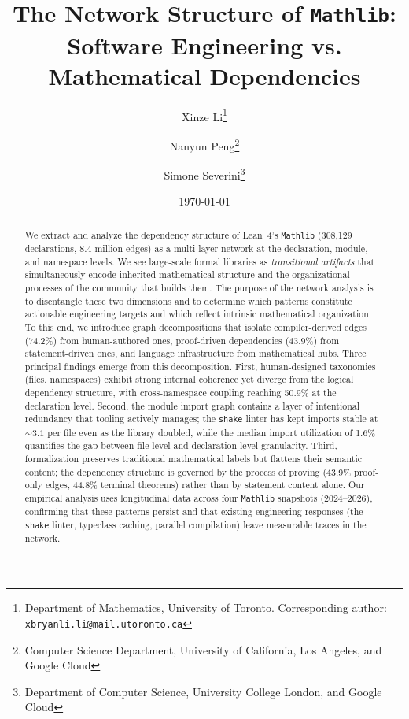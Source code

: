 \documentclass[10pt]{article}
\title{The Network Structure of \texttt{Mathlib}:\\ Software Engineering vs. Mathematical Dependencies}
\author{
  Xinze Li\thanks{Department of Mathematics, University of Toronto. Corresponding author: \texttt{xbryanli.li@mail.utoronto.ca}}
  \and 
  Nanyun Peng\thanks{Computer Science Department, University of California, Los Angeles, and Google Cloud} 
  \and 
  Simone Severini\thanks{Department of Computer Science, University College London, and Google Cloud}
}
\date{\today}
\begin{document}
\maketitle

\begin{abstract}
We extract and analyze the dependency structure of Lean~4's \texttt{Mathlib} (308,129 declarations, 8.4 million edges) as a multi-layer network at the declaration, module, and namespace levels. We see large-scale formal libraries as \emph{transitional artifacts} that simultaneously encode inherited mathematical structure and the organizational processes of the community that builds them. The purpose of the network analysis is to disentangle these two dimensions and to determine which patterns constitute actionable engineering targets and which reflect intrinsic mathematical organization. To this end, we introduce graph decompositions that isolate compiler-derived edges (74.2\%) from human-authored ones, proof-driven dependencies (43.9\%) from statement-driven ones, and language infrastructure from mathematical hubs. Three principal findings emerge from this decomposition. First, human-designed taxonomies (files, namespaces) exhibit strong internal coherence yet diverge from the logical dependency structure, with cross-namespace coupling reaching 50.9\% at the declaration level. Second, the module import graph contains a layer of intentional redundancy that tooling actively manages; the \texttt{shake} linter has kept imports stable at ${\sim}3.1$ per file even as the library doubled, while the median import utilization of 1.6\% quantifies the gap between file-level and declaration-level granularity. Third, formalization preserves traditional mathematical labels but flattens their semantic content; the dependency structure is governed by the process of proving (43.9\% proof-only edges, 44.8\% terminal theorems) rather than by statement content alone. Our empirical analysis uses longitudinal data across four \texttt{Mathlib} snapshots (2024--2026), confirming that these patterns persist and that existing engineering responses (the \texttt{shake} linter, typeclass caching, parallel compilation) leave measurable traces in the network.
\end{abstract}








\end{document}
